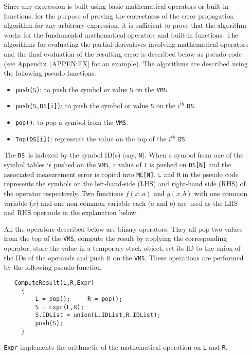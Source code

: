 \documentclass[11pt]{article}
\newcommand{\DS}{{\tt DS}}
\newcommand{\VMS}{{\tt VMS}}
\begin{document}
Since any expression is built using basic mathematical operators or
built-in functions, for the purpose of proving the correctness of the
error propagation algorithm for any arbitrary expression, it is
sufficient to prove that the algorithm works for the fundamental
mathematical operators and built-in functions.  The algorithms for
evaluating the partial derivatives involving mathematical operators
and the final evaluation of the resulting error is described below as
pseudo code (see Appendix~\ref{APPEN:EX} for an example).  The
algorithms are described using the following pseudo functions:
\begin{itemize}
\item {\tt push(S)}: to push the symbol or value {\tt S} on the \VMS. 
\item {\tt push(S,DS[i])}: to push the symbol or value {\tt S} on the
$i^{th}$ \DS.  
\item {\tt pop()}: to pop a symbol from the \VMS.
\item {\tt Top(DS[i])}:  represents the value on the top of the
$i^{th}$ \DS. 
\end{itemize}
The \DS\ is indexed by the symbol ID(s) (say, {\tt N}).  When a symbol
from one of the symbol tables is pushed on the \VMS, a value of $1$ is
pushed on {\tt DS[N]} and the associated measurement error is copied
into {\tt ME[N]}.  {\tt L} and {\tt R} in the pseudo code represents
the symbols on the left-hand-side (LHS) and right-hand side (RHS) of
the operator respectively.  Two functions $f(x,a)$ and $g(x,b)$ with
one common variable ($x$) and one non-common variable each ($a$ and
$b$) are used as the LHS and RHS operands in the explanation below.

All the operators described below are binary operators.  They all pop
two values from the top of the \VMS, compute the result by applying
the corresponding operator, store the value in a temporary stack
object, set its ID to the union of the IDs of the operands and push it
on the \VMS.  These operations are performed by the following pseudo
function:
\begin{verbatim}
   ComputeResult(L,R,Expr)
     {
         L = pop();     R = pop();
         S = Expr(L,R);
         S.IDList = union(L.IDList,R.IDList);
         push(S);
     }
\end{verbatim}
{\tt Expr} implements the arithmetic of the mathematical operation on
{\tt L} and {\tt R}. 

\end{document}
